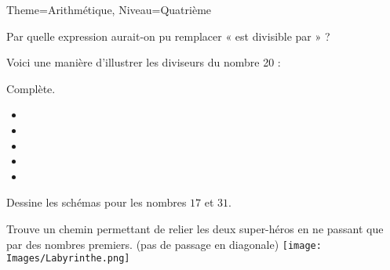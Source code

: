\documentclass[11pt]{article}
\begin{document}
\begin{multicols}{2}
\begin{Maquette}[Fiche]{Theme=Arithmétique, Niveau=Quatrième}
\begin{exercice}[Calculatrice=false]
    \vspace{1.2em}
    Par quelle expression aurait-on pu remplacer « est divisible par » ?
    
\end{exercice}

\columnbreak

\begin{exercice}
    Voici une manière d’illustrer les diviseurs du nombre 20 :

    \begin{center}
    \end{center}
    
    Complète.
    \begin{itemize}[label={}]
        \item {}
        \item {}
        \item {}
        \item {}
        \item {}
    \end{itemize}
    Dessine les schémas pour les nombres $17$ et $31$.
\end{exercice}

\columnbreak
\begin{exercice}
    Trouve un chemin permettant de relier les deux super-héros en ne passant que par des nombres premiers. (pas de passage en diagonale)
    \texttt{[image: Images/Labyrinthe.png]}
\end{exercice}

\end{Maquette}

\end{multicols}
\end{document}
